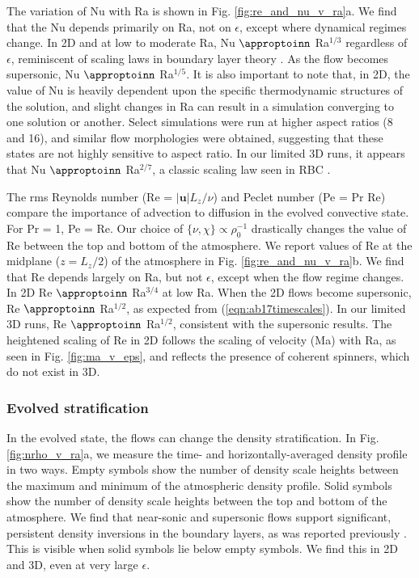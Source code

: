 The variation of Nu with Ra is shown in Fig. \ref{fig:re_and_nu_v_ra}a.  
We find that the Nu depends primarily on Ra, not on $\epsilon$, except where dynamical regimes change.
In 2D and at low to moderate Ra, Nu $\appropto$ Ra$^{1/3}$ regardless of $\epsilon$, reminiscent of scaling laws in \RB boundary layer theory \citep{grossman&lohse2000, ahlers&all2009, king&all2012}.
As the flow becomes supersonic,  Nu $\appropto$ Ra$^{1/5}$.
It is also important to note that, in 2D, the value of Nu is heavily dependent upon the specific thermodynamic structures of the solution, and slight changes in Ra can result in a simulation converging to one solution or another. 
Select simulations were run at higher aspect ratios (8 and 16), and similar flow morphologies were obtained, suggesting that these states are not highly sensitive to aspect ratio.
In our limited 3D runs, it appears that Nu $\appropto$ Ra$^{2/7}$, a classic scaling law seen in RBC \citep{johnston&doering2009}.

The rms Reynolds number (Re = $|\bm{u}|L_z/\nu$) and Peclet number (Pe = Pr Re) compare the importance of advection to diffusion in the evolved convective state.  
For Pr = 1, Pe = Re.  
Our choice of $\{\nu,\chi\}\propto \rho_0^{-1}$ drastically changes the value of Re between the top and bottom of the atmosphere.  
We report values of Re at the midplane ($z=L_z/2$) of the atmosphere in Fig. \ref{fig:re_and_nu_v_ra}b.  
We find that Re depends largely on Ra, but not $\epsilon$, except when the flow regime changes.
In 2D Re $\appropto$ Ra$^{3/4}$ at low Ra.    
When the 2D flows become supersonic,  Re $\appropto$ Ra$^{1/2}$, as expected from (\ref{eqn:ab17timescales}).
In our limited 3D runs, Re $\appropto$ Ra$^{1/2}$, consistent with the supersonic results.
The heightened scaling of Re in 2D follows the scaling of velocity (Ma) with Ra, as seen in Fig. \ref{fig:ma_v_eps}, and reflects the presence of coherent spinners, which do not exist in 3D.

\subsubsection{Evolved stratification}

In the evolved state, the flows can change the density stratification.
In Fig. \ref{fig:nrho_v_ra}a, we measure the time- and horizontally-averaged density profile in two ways. 
Empty symbols show the number of density scale heights between the maximum and minimum of the atmospheric density profile.  
Solid symbols show the number of density scale heights between the top and bottom of the atmosphere. 
We find that near-sonic and supersonic flows support significant, persistent density inversions in the boundary layers, as was reported previously \cite{brandenburg&all2005}.  
This is visible when solid symbols lie below empty symbols.  
We find this in 2D and 3D, even at very large $\epsilon$.  

